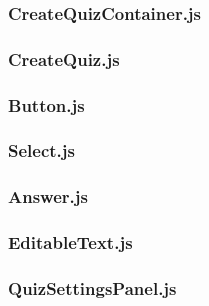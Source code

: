 \subsubsection{CreateQuizContainer.js} %
\label{ssub:createquiz_js}


\subsubsection{CreateQuiz.js} %
\label{ssub:createquiz_js}


\subsubsection{Button.js} %
\label{ssub:yearselector_js}


\subsubsection{Select.js} %
\label{ssub:yearselector_js}


\subsubsection{Answer.js} %
\label{ssub:answer_js}


\subsubsection{EditableText.js} %
\label{ssub:editabletext_js}


\subsubsection{QuizSettingsPanel.js} %
\label{ssub:quizsettingspanel_js}

